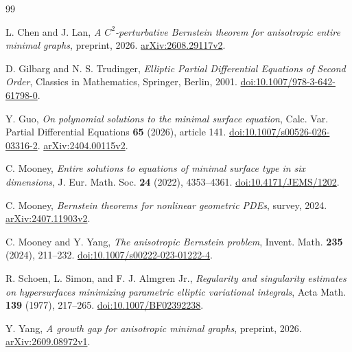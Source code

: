 \documentclass[11pt]{amsart}
\begin{document}
\begin{thebibliography}{99}

L. Chen and J. Lan,
\emph{A \(C^2\)-perturbative Bernstein theorem for anisotropic entire minimal graphs},
preprint, 2026.
\href{https://arxiv.org/abs/2608.29117v2}{arXiv:2608.29117v2}.

D. Gilbarg and N. S. Trudinger,
\emph{Elliptic Partial Differential Equations of Second Order},
Classics in Mathematics, Springer, Berlin, 2001.
\href{https://doi.org/10.1007/978-3-642-61798-0}{doi:10.1007/978-3-642-61798-0}.

Y. Guo,
\emph{On polynomial solutions to the minimal surface equation},
Calc. Var. Partial Differential Equations \textbf{65} (2026), article 141.
\href{https://doi.org/10.1007/s00526-026-03316-2}{doi:10.1007/s00526-026-03316-2}.
\href{https://arxiv.org/abs/2404.00115v2}{arXiv:2404.00115v2}.

C. Mooney,
\emph{Entire solutions to equations of minimal surface type in six dimensions},
J. Eur. Math. Soc. \textbf{24} (2022), 4353--4361.
\href{https://doi.org/10.4171/JEMS/1202}{doi:10.4171/JEMS/1202}.

C. Mooney,
\emph{Bernstein theorems for nonlinear geometric PDEs},
survey, 2024.
\href{https://arxiv.org/abs/2407.11903v2}{arXiv:2407.11903v2}.

C. Mooney and Y. Yang,
\emph{The anisotropic Bernstein problem},
Invent. Math. \textbf{235} (2024), 211--232.
\href{https://doi.org/10.1007/s00222-023-01222-4}{doi:10.1007/s00222-023-01222-4}.

R. Schoen, L. Simon, and F. J. Almgren Jr.,
\emph{Regularity and singularity estimates on hypersurfaces minimizing parametric elliptic variational integrals},
Acta Math. \textbf{139} (1977), 217--265.
\href{https://doi.org/10.1007/BF02392238}{doi:10.1007/BF02392238}.

Y. Yang,
\emph{A growth gap for anisotropic minimal graphs},
preprint, 2026.
\href{https://arxiv.org/abs/2609.08972v1}{arXiv:2609.08972v1}.

\end{thebibliography}
\end{document}
